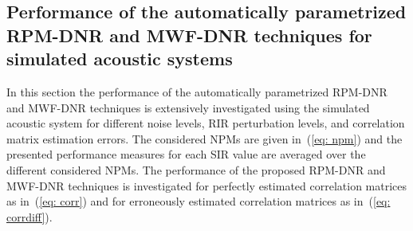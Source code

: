 \documentclass[10pt]{IEEEtran}
\begin{document}
\subsection{Performance of the automatically parametrized RPM-DNR and MWF-DNR techniques for simulated acoustic systems}
\label{sec: expc}
In this section the performance of the automatically parametrized RPM-DNR and MWF-DNR techniques is extensively investigated using the simulated acoustic system for different noise levels, RIR perturbation levels, and correlation matrix estimation errors. 
The considered NPMs are given in~(\ref{eq: npm}) and the presented performance measures for each SIR value are averaged over the different considered NPMs. 
The performance of the proposed RPM-DNR and MWF-DNR techniques is investigated for perfectly estimated correlation matrices as in~(\ref{eq: corr}) and for erroneously estimated correlation matrices as in~(\ref{eq: corrdiff}).
\end{document}
